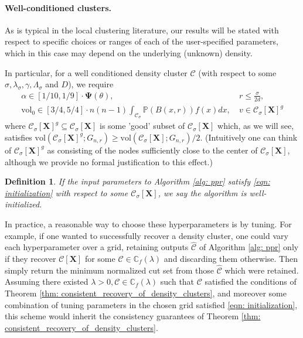 \documentclass{article}
\newcommand{\vol}{\mathrm{vol}}
\newcommand{\1}{\mathbf{1}}
\newcommand{\Xbf}{\mathbf{X}}
\newcommand{\Pbb}{\mathbb{P}}
\newcommand{\Cbb}{\mathbb{C}}
\newcommand{\Cset}{\mathcal{C}}
\newcommand{\Csig}{\Cset_{\sigma}}
\theoremstyle{aldenthm}
\newtheorem{definition}{Definition}
\theoremstyle{aldenrmrk}
\begin{document}
\paragraph{Well-conditioned clusters.}


As is typical in the local clustering literature, our results will be stated with respect to specific choices or ranges of each of the user-specified parameters, which in this case may depend on the underlying (unknown) density. 

In particular, for a well conditioned density cluster $\Cset$ (with respect to some $\sigma, \lambda_{\sigma}, \gamma, \Lambda_{\sigma}$ and $D$), we require
\begin{align}
\label{eqn: initialization}
\alpha \in [1/10, 1/9] \cdot \mathbf{\Psi}(\theta), & ~r \leq \frac{\sigma}{2d} \nonumber,  \\
\vol_0 \in [3/4,5/4] \cdot n(n-1) \int_{\Csig} \Pbb(B(x,r)) f(x) dx, & ~v \in \Csig[\Xbf]^g
\end{align}
where $\Csig[\Xbf]^g \subseteq \Csig[\Xbf]$ is some 'good' subset of $\Csig[\Xbf]$ which, as we will see, satisfies $\vol(\Csig[\Xbf]^g; G_{n,r}) \geq \vol(\Csig[\Xbf]; G_{n,r})/2$. (Intuitively one can think of $\Csig[\Xbf]^g$ as consisting of the nodes sufficiently close to the center of $\Csig[\Xbf]$, although we provide no formal justification to this effect.)

\begin{definition}
	If the input parameters to Algorithm \ref{alg: ppr} satisfy \eqref{eqn: initialization} with respect to some $\Csig[\Xbf]$, we say the algorithm is  \emph{well-initialized}.
\end{definition}


In practice, a reasonable way to choose these hyperparameters is by tuning. For example, if one wanted to successfully recover a density cluster, one could vary each hyperparameter over a grid, retaining outputs $\widehat{\Cset}$ of Algorithm \ref{alg: ppr} only if they recover $\Cset[\Xbf]$ for some $\Cset \in \Cbb_f(\lambda)$ and discarding them otherwise. Then simply return the minimum normalized cut set from those $\widehat{\Cset}$ which were retained. Assuming there existed $\lambda > 0, \Cset \in \Cbb_f(\lambda)$ such that $\Cset$ satisfied the conditions of Theorem \ref{thm: consistent_recovery_of_density_clusters}, and moreover some combination of tuning parameters in the chosen grid satisfied \eqref{eqn: initialization}, this scheme would inherit the consistency guarantees of Theorem \ref{thm: consistent_recovery_of_density_clusters}.
\end{document}
